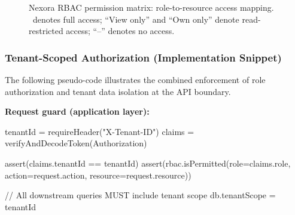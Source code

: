 \documentclass[11pt]{article}
\newenvironment{Shaded}{}{}
\newcommand{\NormalTok}[1]{#1}
\begin{document}
\begin{figure}[h]
  \centering
  \small
  \setlength{\tabcolsep}{4pt}
  \caption{Nexora RBAC permission matrix: role-to-resource access mapping. \checkmark~denotes full access; ``View only'' and ``Own only'' denote read-restricted access; ``--'' denotes no access.}
\end{figure}

\subsubsection{Tenant-Scoped Authorization (Implementation
Snippet)}\label{tenant-scoped-authorization-implementation-snippet}

The following pseudo-code illustrates the combined enforcement of role
authorization and tenant data isolation at the API boundary.

\textbf{Request guard (application layer):}

\begin{Shaded}
\begin{Highlighting}[]
\NormalTok{tenantId = requireHeader("X{-}Tenant{-}ID")}
\NormalTok{claims = verifyAndDecodeToken(Authorization)}

\NormalTok{assert(claims.tenantId == tenantId)}
\NormalTok{assert(rbac.isPermitted(role=claims.role, action=request.action, resource=request.resource))}

\NormalTok{// All downstream queries MUST include tenant scope}
\NormalTok{db.tenantScope = tenantId}
\end{Highlighting}
\end{Shaded}
\end{document}
